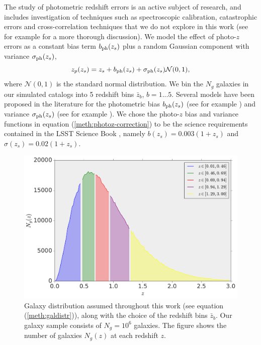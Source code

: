 \documentclass[reprint,aps,prd,superscriptaddress,showkeys,showpacs]{revtex4-1}
\begin{document}
The study of photometric redshift errors is an active subject of research, and includes investigation of techniques such as spectroscopic calibration, catastrophic errors and cross-correlation techniques that we do not explore in this work (see for example \citep{HuTomo} for a more thorough discussion). We model the effect of photo-$z$ errors as a constant bias term $b_{\rm ph}(z_s)$ plus a random Gaussian component with variance $\sigma_{\rm ph}(z_s)$,
\begin{equation}
\label{meth:photoz-correction}
z_p(z_s) = z_s + b_{\rm ph}(z_s) + \sigma_{\rm ph}(z_s)\mathcal{N}(0,1),   
\end{equation}
%
where $\mathcal{N}(0,1)$ is the standard normal distribution. We bin the $N_g$ galaxies in our simulated catalogs into 5 redshift bins $\bar{z}_b$, $b=1...5$. Several models have been proposed in the literature for the photometric bias $b_{\rm ph}(z_s)$ (see for example \citep{Huterer2006}) and variance $\sigma_{\rm ph}(z_s)$ (see for example \citep{LSSTSciBook}). We chose the photo-$z$ bias and variance functions in equation (\ref{meth:photoz-correction}) to be the science requirements contained in the LSST Science Book \citep{LSSTSciBook}, namely $b(z_s)=0.003(1+z_s)$ and $\sigma(z_s)=0.02(1+z_s)$. 

\begin{figure}
\includegraphics[scale=0.3]{Figures/galdistr.pdf}
\caption{Galaxy distribution assumed throughout this work (see equation (\ref{meth:galdistr})), along with the choice of the redshift bins $\bar{z}_b$. Our galaxy sample consists of $N_g=10^6$ galaxies. The figure shows the number of galaxies $N_g(z)$ at each redshift $z$.}
\label{fig:galdistr}
\end{figure}
\end{document}
